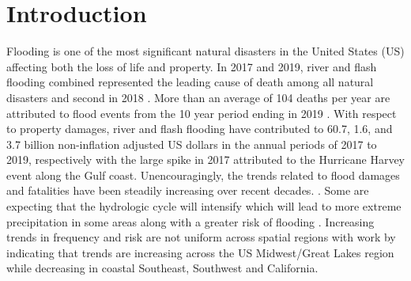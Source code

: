 \section{Introduction}
%
Flooding is one of the most significant natural disasters in the United States (US) affecting both the loss of life and property. 
In 2017 and 2019, river and flash flooding combined represented the leading cause of death among all natural disasters and second in 2018 \cite{national_weather_service_2020,national_weather_service_2019,national_weather_service_2018}. 
More than an average of 104 deaths per year are attributed to flood events from the 10 year period ending in 2019 \cite{us_department_of_commerce_2020}. 
With respect to property damages, river and flash flooding have contributed to 60.7, 1.6, and 3.7 billion non-inflation adjusted US dollars in the annual periods of 2017 to 2019, respectively \cite{national_weather_service_2020,national_weather_service_2019,national_weather_service_2018} with the large spike in 2017 attributed to the Hurricane Harvey event along the Gulf coast. 
Unencouragingly, the trends related to flood damages and fatalities have been steadily increasing over recent decades. \cite{mallakpour2015changing,downton2005reanalysis,kunkel1999temporal,pielke2000precipitation,corringham2019effect}. 
Some are expecting that the hydrologic cycle will intensify which will lead to more extreme precipitation in some areas along with a greater risk of flooding \cite{tabari2020climate,milly2002increasing,wing2018estimates}. 
Increasing trends in frequency and risk are not uniform across spatial regions with work by  indicating that trends are increasing across the US Midwest/Great Lakes region while decreasing in coastal Southeast, Southwest and California.
%
